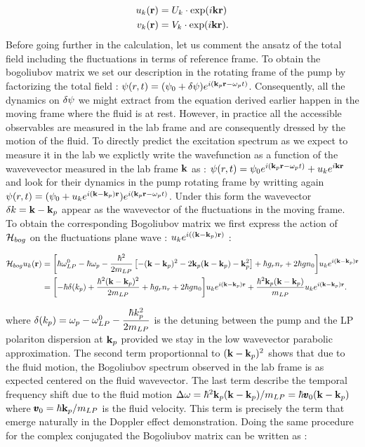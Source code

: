 \begin{subequations}
    \begin{align}
        u_k(\mathbf{r})&=U_k\cdot\mathrm{exp}(i\mathbf{k}\mathbf{r}) \\
        v_k(\mathbf{r})&=V_k \cdot\mathrm{exp}(i\mathbf{k}\mathbf{r}).
    \end{align}
\end{subequations}
Before going further in the calculation, let us comment the ansatz of the total field including the fluctuations in terms of reference frame. To obtain the bogoliubov matrix 
we set our description in the rotating frame of the pump by factorizing the total field : $\psi(r,t)=(\psi_0+\delta\psi)e^{i(\mathbf{k}_p\mathbf{r}-\omega_pt)}$. Consequently, all the dynamics on $\delta\psi$ we might extract from the equation derived earlier
happen in the moving frame where the fluid is at rest. However, in practice all the accessible observables are measured in the lab frame and are consequently dressed by the motion of the fluid. To directly predict the excitation spectrum as we expect to measure it in the lab
we explictly write the wavefunction as a function of the wavevevector measured in the lab frame $\mathbf{k}$ as : $\psi(r,t)=\psi_0e^{i(\mathbf{k}_p\mathbf{r}-\omega_pt)}+ u_k e^{i\mathbf{k}\mathbf{r}}$ and look for their dynamics in the pump rotating frame by writting again $\psi(r,t)=(\psi_0+u_ke^{i(\mathbf{k}-\mathbf{k}_p)\mathbf{r}})e^{i(\mathbf{k}_p\mathbf{r}-\omega_pt)}$. Under this form
the wavevector $\delta k=\mathbf{k}-\mathbf{k}_p$ appear as the wavevector of the fluctuations in the moving frame. 
To obtain the corresponding Bogoliubov matrix we first express the action of $\mathcal{H}_{bog}$ on the fluctuations plane wave : $u_ke^{i((\mathbf{k}-\mathbf{k}_p)\mathbf{r})}$ :

\begin{equation}
    \begin{align}
    \mathcal{H}_{bog}u_k(\mathbf{r}) &= \biggl[\hbar\omega_{LP}^0 - \hbar \omega_p-\dfrac{\hbar^2}{2m_{LP}}\left[-(\mathbf{k}-\mathbf{k}_p)^2 -2\mathbf{k}_p(\mathbf{k}-\mathbf{k}_p)-\mathbf{k}_p^2\right]+\hbar g_rn_r + 2\hbar g n_0 \biggr]u_ke^{i(\mathbf{k}-\mathbf{k}_p)\mathbf{r}} \\
            &= \biggl[-\hbar\delta(k_p)+\dfrac{\hbar^2(\mathbf{k}-\mathbf{k}_p)^2}{2m_{LP}}+\hbar g_rn_r + 2\hbar g n_0\biggr]u_ke^{i(\mathbf{k}-\mathbf{k}_p)\mathbf{r}} + \dfrac{\hbar^2\mathbf{k}_p(\mathbf{k}-\mathbf{k}_p)}{m_{LP}}u_ke^{i(\mathbf{k}-\mathbf{k}_p)\mathbf{r}}.
    \end{align}
    \label{eq:ham_bog_plane_wave}
\end{equation}

where $\delta(k_p)=\omega_p - \omega_{LP}^0 - \dfrac{\hbar k_p^2}{2m_{LP}}$ is the detuning between the pump and the LP polariton dispersion at $\mathbf{k}_p$ provided we stay in the low wavevector
parabolic approximation. The second term proportionnal to $(\mathbf{k}-\mathbf{k}_p)^2$ shows that due to the fluid motion, the Bogoliubov spectrum observed in the lab frame is as expected
centered on the fluid wavevector. The last term describe the temporal frequency shift due to the fluid motion  $\Delta\omega =\hbar^2\mathbf{k}_p(\mathbf{k}-\mathbf{k}_p)/m_{LP}=\hbar\pmb{v}_0(\mathbf{k}-\mathbf{k}_p)$ where $\pmb{v}_0=\hbar\mathbf{k}_p/m_{LP}$ is the fluid velocity. This term is precisely
the term that emerge naturally in the Doppler effect demonstration.
Doing the same procedure for the complex conjugated the Bogoliubov matrix can be written as :



